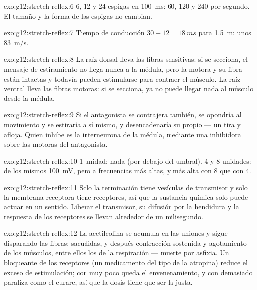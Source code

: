 \begin{solution}{exo:g12:stretch-reflex:6}
6, 12 y 24 espigas en \qty{100}{ms}: 60, 120 y 240 por segundo. El
tamaño y la forma de las espigas no cambian.
\end{solution}

\begin{solution}{exo:g12:stretch-reflex:7}
Tiempo de conducción $30 - 12 = \qty{18}{ms}$ para \qty{1.5}{m}: unos
\qty{83}{m/s}.
\end{solution}

\begin{solution}{exo:g12:stretch-reflex:8}
La raíz dorsal lleva las fibras sensitivas: si se secciona, el mensaje
de estiramiento no llega nunca a la médula, pero la  motora y su
fibra están intactas y todavía pueden estimularse para contraer el
músculo. La raíz ventral lleva las fibras motoras: si se secciona, ya
no puede llegar nada al músculo desde la médula.
\end{solution}

\begin{solution}{exo:g12:stretch-reflex:9}
Si el antagonista se contrajera también, se opondría al movimiento y se
estiraría a sí mismo, y desencadenaría su propio  --- un tira y
afloja. Quien inhibe es la interneurona de la médula, mediante una
 inhibidora sobre las  motoras del antagonista.
\end{solution}

\begin{solution}{exo:g12:stretch-reflex:10}
1 unidad: nada (por debajo del umbral). 4 y 8 unidades:  de los mismos \qty{100}{mV}, pero a frecuencias más altas, y más
alta con 8 que con 4.
\end{solution}

\begin{solution}{exo:g12:stretch-reflex:11}
Solo la terminación tiene vesículas de transmisor y solo la membrana
receptora tiene receptores, así que la sustancia química solo puede
actuar en un sentido. Liberar el transmisor, su difusión por la
hendidura y la respuesta de los receptores se llevan alrededor de un
milisegundo.
\end{solution}

\begin{solution}{exo:g12:stretch-reflex:12}
La acetilcolina se acumula en las uniones y sigue disparando las
fibras: sacudidas, y después contracción sostenida y agotamiento de los
músculos, entre ellos los de la respiración --- muerte por asfixia. Un
bloqueante de los receptores (un medicamento del tipo de la atropina)
reduce el exceso de estimulación; con muy poco queda el
envenenamiento, y con demasiado paraliza como el curare, así que la
dosis tiene que ser la justa.
\end{solution}

